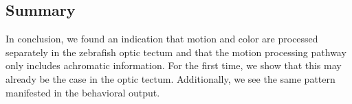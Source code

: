 

\subsection{Summary}
In conclusion, we found an indication that motion and color are processed separately in the zebrafish optic tectum and that the motion processing pathway only includes achromatic information. For the first time, we show that this may already be the case in the optic tectum. Additionally, we see the same pattern manifested in the behavioral output. 
